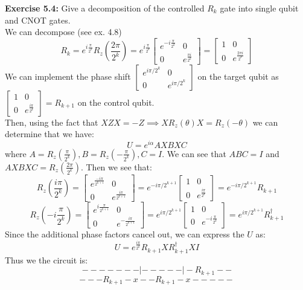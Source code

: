 \documentclass{article}
\begin{document}
\begin{tcolorbox}\textbf{Exercise 5.4:} Give a decomposition of the controlled $R_k$ gate into single qubit and CNOT gates.\\
We can decompose (see ex. 4.8) $$R_k = e^{i\frac{\pi}{2^{k}}} R_z(\frac{2\pi}{2^k}) = e^{i \frac{\pi}{2^k}} \begin{bmatrix}e^{-i\frac{\pi}{2^k}} & 0 \\ 0 & e^{\frac{\pi i}{2^k}}\end{bmatrix} = \begin{bmatrix} 1 & 0 \\ 0 & e^{\frac{2\pi i}{2^k}}\end{bmatrix}$$
We can implement the phase shift $\begin{bmatrix} e^{i\pi /2^k} & 0 \\ 0 & e^{i \pi / 2^k}\end{bmatrix}$ on the target qubit as $\begin{bmatrix} 1 & 0 \\ 0 & e^{\frac{i\pi}{2^k}}\end{bmatrix} = R_{k+1}$ on the control qubit.\\
Then, using the fact that $XZX = -Z \implies X R_z(\theta) X = R_z (-\theta)$ we can determine that we have:
$$U = e^{i\alpha} AXBXC$$
where $A = R_z(\frac{\pi}{2^k}), B = R_z(-\frac{\pi}{2^k}), C = I$. We can see that $ABC = I$ and $AXBXC = R_z(\frac{2\pi}{2^k})$. Then we see that:
$$R_z(\frac{i\pi}{2^k}) = \begin{bmatrix}e^{\frac{-i\pi}{2^{k+1}}} & 0 \\ 0& e^{\frac{i\pi}{2^{k+1}}}\end{bmatrix}= e^{-i\pi/2^{k+1}} \begin{bmatrix}1& 0 \\ 0& e^{\frac{i\pi}{2^{k}}}\end{bmatrix} = e^{-i\pi /2^{k+1}} R_{k+1} $$
$$R_z(-i\frac{\pi}{2^k}) = \begin{bmatrix}e^{i\frac{\pi}{2^{k+1}}} & 0 \\ 0& e^{-\frac{i\pi}{2^{k+1}}}\end{bmatrix}= e^{i\pi/2^{k+1}} \begin{bmatrix}1& 0 \\ 0& e^{-i\frac{\pi}{2^{k}}}\end{bmatrix} = e^{i\pi /2^{k+1}} R^\dag_{k+1} $$
Since the additional phase factors cancel out, we can express the $U$ as:
$$U = e^{\frac{i\pi}{2^k}} R_{k+1}XR^\dag_{k+1}X I$$
Thus we the circuit is:
$$-------|-----|-R_{k+1}--$$
$$---R_{k+1}-x--R_{k+1}-x-----$$
\end{tcolorbox}
\end{document}
